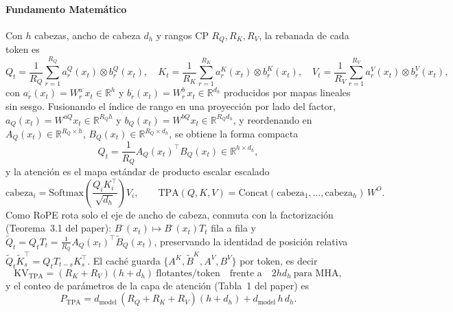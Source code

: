 \paragraph{Fundamento Matemático}
Con $h$ cabezas, ancho de cabeza $d_h$ y rangos CP $R_Q,R_K,R_V$, la rebanada de cada token es
\[
Q_t = \frac{1}{R_Q}\sum_{r=1}^{R_Q} a^Q_r(x_t)\otimes b^Q_r(x_t),\quad
K_t = \frac{1}{R_K}\sum_{r=1}^{R_K} a^K_r(x_t)\otimes b^K_r(x_t),\quad
V_t = \frac{1}{R_V}\sum_{r=1}^{R_V} a^V_r(x_t)\otimes b^V_r(x_t),
\]
con $a^\cdot_r(x_t)=W^{a^\cdot}_r x_t\in\mathbb{R}^{h}$ y $b^\cdot_r(x_t)=W^{b^\cdot}_r x_t\in\mathbb{R}^{d_h}$ producidos por mapas lineales sin sesgo. Fusionando el índice de rango en una proyección por lado del factor, $a_Q(x_t)=W^{aQ}x_t\in\mathbb{R}^{R_Q h}$ y $b_Q(x_t)=W^{bQ}x_t\in\mathbb{R}^{R_Q d_h}$, y reordenando en $A_Q(x_t)\in\mathbb{R}^{R_Q\times h}$, $B_Q(x_t)\in\mathbb{R}^{R_Q\times d_h}$, se obtiene la forma compacta
\[
Q_t = \frac{1}{R_Q}A_Q(x_t)^{\top}B_Q(x_t)\in\mathbb{R}^{h\times d_h},
\]
y la atención es el mapa estándar de producto escalar escalado
\[
\mathrm{cabeza}_i = \mathrm{Softmax}\!\left(\frac{Q_iK_i^{\top}}{\sqrt{d_h}}\right)V_i,\qquad
\mathrm{TPA}(Q,K,V)=\mathrm{Concat}(\mathrm{cabeza}_1,\dots,\mathrm{cabeza}_h)\,W^O .
\]
Como RoPE rota solo el eje de ancho de cabeza, conmuta con la factorización (Teorema~3.1 del paper): $B^\cdot(x_t)\mapsto B^\cdot(x_t)T_t$ fila a fila y $\widetilde{Q}_t=Q_tT_t=\frac{1}{R_Q}A_Q(x_t)^{\top}\widetilde{B}_Q(x_t)$, preservando la identidad de posición relativa $\widetilde{Q}_t\widetilde{K}_s^{\top}=Q_tT_{t-s}K_s^{\top}$. El caché guarda $\{A^K,\widetilde{B}^K,A^V,B^V\}$ por token, es decir
\[
\mathrm{KV}_{\mathrm{TPA}}=(R_K+R_V)(h+d_h)\ \text{flotantes/token}
\quad\text{frente a}\quad 2hd_h\ \text{para MHA},
\]
y el conteo de parámetros de la capa de atención (Tabla~1 del paper) es
\[
P_{\mathrm{TPA}} = d_{\text{model}}\,(R_Q+R_K+R_V)(h+d_h) + d_{\text{model}}\,h\,d_h .
\]

